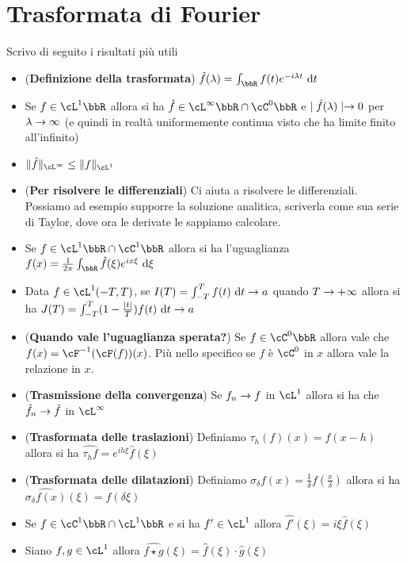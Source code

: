 \documentclass[a4paper,NoNotes,GeneralMath]{stdmdoc}
\newcommand{\fractopie}{\frac{1}{2\pi}}
\begin{document}
        \section*{Trasformata di Fourier}
        Scrivo di seguito i risultati più utili
        \begin{itemize}
        \item ({\bf Definizione della trasformata}) $\hat{f}(\lambda) = \int_\bbR f(t) e^{-i \lambda t} \de t$
        \item Se $f \in \cL^1 \bbR$ allora si ha $\hat{f} \in \cL^\infty \bbR \cap \cC^0 \bbR$ e $\mid \hat{f}(\lambda) \mid \rightarrow 0$ per $\lambda \rightarrow \infty$ (e quindi in realtà uniformemente continua visto che ha limite finito all'infinito)
        \item $\norm{\hat{f}}_{\cL^\infty} \le \norm{f}_{\cL^1}$
        \item ({\bf Per risolvere le differenziali}) Ci aiuta a risolvere le differenziali. Possiamo ad esempio supporre la soluzione analitica, scriverla come sua serie di Taylor, dove ora le derivate le sappiamo calcolare.
        \item Se $f \in \cL^1 \bbR \cap \cC^1 \bbR$ allora si ha l'uguaglianza $f(x) = \fractopie \int_\bbR \hat{f}(\xi) e^{ix\xi} \de \xi$
        \item Data $f \in \cL^1(-T, T)$, se $I(T) = \int_{-T}^T f(t) \de t \rar a$ quando $T \rightarrow +\infty$ allora si ha $J(T) = \int_{-T}^T (1 - \frac{\abs{t}}{T}) f(t) \de t \rar a$
        \item ({\bf Quando vale l'uguaglianza sperata?}) Se $f \in \cC^0 \bbR$ allora vale che $f(x) = \cF^{-1}(\cF(f)) (x)$. Più nello specifico se $f$ è $\cC^0$ in $x$ allora vale la relazione in $x$.
        \item ({\bf Trasmissione della convergenza}) Se $f_n \rightarrow f$ in $\cL^1$ allora si ha che $\hat{f}_n \rightarrow \hat{f}$ in $\cL^\infty$
        \item ({\bf Trasformata delle traslazioni}) Definiamo $\tau_h(f)(x) = f(x - h)$ allora si ha $\hat{\tau_h f} = e^{ih\xi} \hat{f}(\xi)$
        \item ({\bf Trasformata delle dilatazioni}) Definiamo $\sigma_\delta f(x) = \frac{1}{\delta} f(\frac{x}{\delta})$ allora si ha $\hat{\sigma_\delta f(x)}(\xi) = \hat{f}(\delta \xi)$
        \item Se $f \in \cC^1 \bbR \cap \cL^1 \bbR$ e si ha $f' \in \cL^1$ allora $\hat{f'}(\xi) = i \xi \hat{f}(\xi)$
        \item Siano $f, g \in \cL^1$ allora $\hat{f \star g}(\xi) = \hat{f}(\xi) \cdot \hat{g}(\xi)$

\end{itemize}
\end{document}
